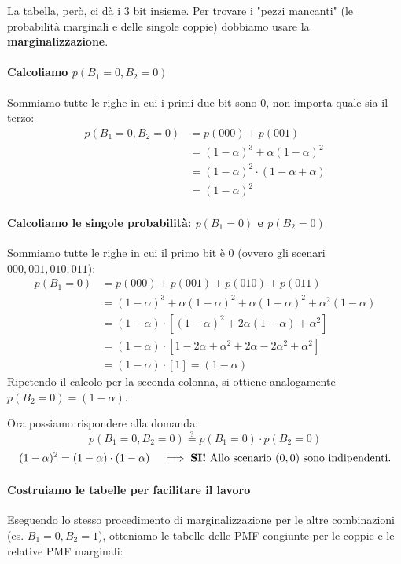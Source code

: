 La tabella, però, ci dà i 3 bit insieme. Per trovare i "pezzi mancanti" (le probabilità marginali e delle singole coppie) dobbiamo usare la \textbf{marginalizzazione}.

\paragraph{Calcoliamo $p(B_1=0, B_2=0)$}
Sommiamo tutte le righe in cui i primi due bit sono 0, non importa quale sia il terzo:
\begin{align*}
p(B_1=0, B_2=0) &= p(000) + p(001) \\
&= (1-\alpha)^3 + \alpha(1-\alpha)^2 \\
&= (1-\alpha)^2 \cdot (1-\alpha+\alpha) \\
&= (1-\alpha)^2
\end{align*}

\paragraph{Calcoliamo le singole probabilità: $p(B_1=0)$ e $p(B_2=0)$}
Sommiamo tutte le righe in cui il primo bit è 0 (ovvero gli scenari $000, 001, 010, 011$):
\begin{align*}
p(B_1=0) &= p(000) + p(001) + p(010) + p(011) \\
&= (1-\alpha)^3 + \alpha(1-\alpha)^2 + \alpha(1-\alpha)^2 + \alpha^2(1-\alpha) \\
&= (1-\alpha) \cdot \left[ (1-\alpha)^2 + 2\alpha(1-\alpha) + \alpha^2 \right] \\
&= (1-\alpha) \cdot \left[ 1 - 2\alpha + \alpha^2 + 2\alpha - 2\alpha^2 + \alpha^2 \right] \\
&= (1-\alpha) \cdot [ 1 ] = (1-\alpha)
\end{align*}
Ripetendo il calcolo per la seconda colonna, si ottiene analogamente $p(B_2=0) = (1-\alpha)$.

Ora possiamo rispondere alla domanda:
\[ p(B_1=0, B_2=0) \stackrel{?}{=} p(B_1=0) \cdot p(B_2=0) \]
\[ (1-\alpha)^2 = (1-\alpha) \cdot (1-\alpha) \quad \implies \text{\textbf{SI!} Allo scenario } (0,0) \text{ sono indipendenti.} \]

\paragraph{Costruiamo le tabelle per facilitare il lavoro}
Eseguendo lo stesso procedimento di marginalizzazione per le altre combinazioni (es. $B_1=0, B_2=1$), otteniamo le tabelle delle PMF congiunte per le coppie e le relative PMF marginali:


